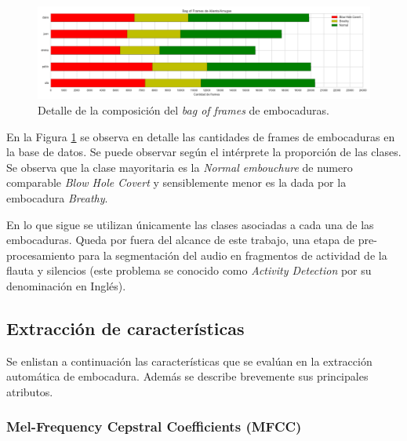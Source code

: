 \documentclass{article}
\begin{document}
\begin{figure}[H]
\begin{center}
\includegraphics[width=1\textwidth]{dataset} 
\caption{Detalle de la composición del \textit{bag of frames} de embocaduras.}
\label{fig:dataset}
\end{center}
\end{figure}

En la Figura \ref{fig:dataset} se observa en detalle las cantidades de frames de embocaduras en la base de datos. Se puede observar según el intérprete la proporción de las clases. Se observa que la clase mayoritaria es la \textit{Normal embouchure} de numero comparable \textit{Blow Hole Covert} y sensiblemente menor es la dada por la embocadura \textit{Breathy}.

\medskip
En lo que sigue se utilizan únicamente las clases asociadas a cada una de las embocaduras. Queda por fuera del alcance de este trabajo, una etapa de pre-procesamiento para la segmentación del audio en fragmentos de actividad de la flauta y silencios (este problema se conocido como \textit{Activity Detection} por su denominación en Inglés). 
\medskip 


\subsection{Extracción de características}
\label{descriptores}
Se enlistan a continuación las características que se evalúan en la extracción automática de embocadura. Además se describe brevemente sus principales atributos.



\subsubsection{Mel-Frequency Cepstral Coefficients (MFCC)} 
\end{document}
